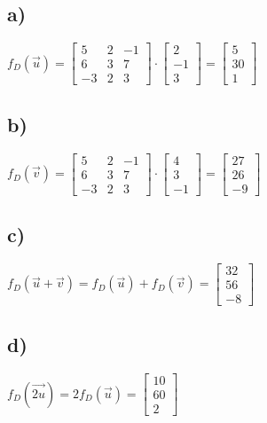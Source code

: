 \documentclass{article}
\begin{document}
	\subsection*{a) }	$f_{D}(\vec{u}) 
				=
				\begin{bmatrix}
    			5	&	2	&	-1	\\
    			6	&	3	&	7	\\
    			-3	&	2	&	3
    			\end{bmatrix}   
    			\cdot
    			\begin{bmatrix}
    			2   	\\
   				-1 		\\
   				3		
   				\end{bmatrix}
   				=
				\begin{bmatrix}
    			5 \\
    			30 \\
    			1
    			\end{bmatrix} 				
				$
				
	\subsection*{b) }	$f_{D}(\vec{v}) 
				=
				\begin{bmatrix}
    			5	&	2	&	-1	\\
    			6	&	3	&	7	\\
    			-3	&	2	&	3
    			\end{bmatrix}   
    			\cdot
    			\begin{bmatrix}
    			4   	\\
   				3 		\\
   				-1		
   				\end{bmatrix}
   				=
				\begin{bmatrix}
    			27   	\\
   				26		\\
   				-9		
   				\end{bmatrix} 				
				$
	\subsection*{c) }	$f_{D}(\vec{u} + \vec{v})
				=
				f_{D}(\vec{u}) + f_{D}(\vec{v})	=
				\begin{bmatrix}
    			32   	\\
   				56		\\
   				-8		
   				\end{bmatrix} 	
   				$
	\subsection*{d) }	$f_{D}(\vec{2u})
				=
				2f_{D}(\vec{u})
				=
				\begin{bmatrix}
    			10 \\
    			60 \\
    			2
    			\end{bmatrix}
				$
\end{document}
